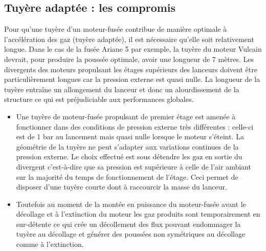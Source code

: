 \documentclass{report}
\begin{document}
\subsection{Tuyère adaptée : les compromis}

Pour qu'une tuyère d'un moteur-fusée contribue de manière optimale à l'accélération des gaz (tuyère adaptée), il est nécessaire qu'elle soit relativement longue. Dans le cas de la fusée Ariane 5 par exemple, la tuyère du moteur Vulcain devrait, pour produire la poussée optimale, avoir une longueur de 7 mètres. Les divergents des moteurs propulsant les étages supérieurs des lanceurs doivent être particulièrement longues car la pression externe est quasi nulle. La longueur de la tuyère entraîne un allongement du lanceur et donc un alourdissement de la structure ce qui est préjudiciable aux performances globales.

\begin{itemize}
    \item Une tuyère de moteur-fusée propulsant de premier étage est amenée à fonctionner dans des conditions de pression externe très différentes : celle-ci est de 1 bar au lancement mais quasi nulle lorsque le moteur s'éteint. La géométrie de la tuyère ne peut s'adapter aux variations continues de la pression externe. Le choix effectué est sous détendre les gaz en sortie du divergent c'est-à-dire que sa pression est supérieure à celle de l'air ambiant sur la majorité du temps de fonctionnement de l'étage. Ceci permet de disposer d'une tuyère courte dont à raccourcir la masse du lanceur.
    \item Toutefois au moment de la montée en puissance du moteur-fusée avant le décollage et à l'extinction du moteur les gaz produits sont temporairement en sur-détente ce qui crée un décollement des flux pouvant endommager la tuyère au décollage et générer des poussées non symétriques au décollage comme à l'extinction.
\end{itemize}
\end{document}

